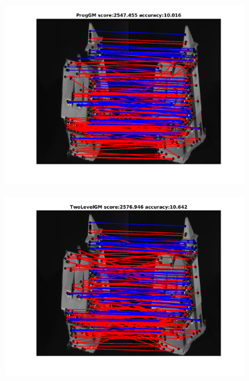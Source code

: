 \documentclass[
	fontsize=12pt,
	paper=a4,
	twoside=false,
	numbers=noenddot,
	plainheadsepline,
	toc=listof,
	toc=bibliography
]{scrartcl}
\begin{document}
\begin{figure}[h] 		
	\begin{subfigure}[b]{0.3\textwidth}
		\centering
		\includegraphics[scale=0.25]{"fig_ver2608/RealImages/HouseSeq/anchor_descr/using_cpd_afftrafo/solution/fi_4_ProgGM"}  
	\end{subfigure}%
	\begin{subfigure}[b]{0.3\textwidth}
		\centering
		\includegraphics[scale=0.25]{"fig_ver2608/RealImages/HouseSeq/anchor_descr/using_cpd_afftrafo/solution/fi_4_TwoLevelGM"}  
	\end{subfigure} 
	\begin{subfigure}[b]{0.3\textwidth}
		\centering

\end{subfigure}
\end{figure}
\end{document}
